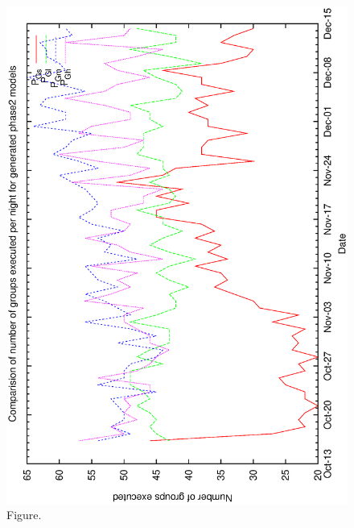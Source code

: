 \documentclass[12pt,a4paper]{article}
\begin{document}
\begin{figure}[htbp]
 \begin{center}
  \includegraphics[scale=1.0, angle=0]{figures/c60_gen_ng.eps}
 \end{center}
  \caption[Figure.]
{Figure.}
\end{figure}
\clearpage
\end{document}
